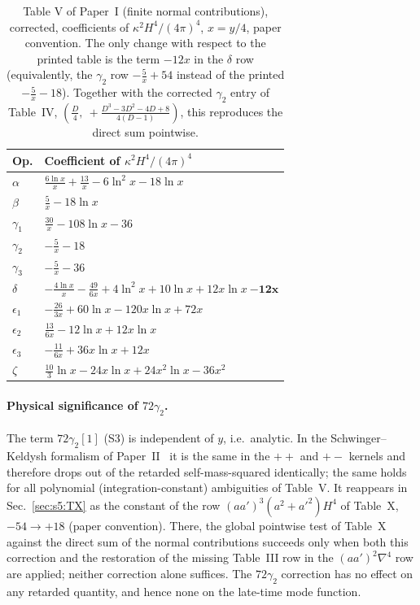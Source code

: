 \documentclass[aps,prd,onecolumn,10pt,nofootinbib,floatfix]{revtex4-2}
\newcommand{\PI}{Paper~I}
\newcommand{\PII}{Paper~II}
\begin{document}
\begin{table}[tb]
\caption{Table V of \PI{} (finite normal contributions), corrected, coefficients of $\kappa^2H^4/(4\pi)^4$, $x=y/4$,
paper convention. The only change with respect to the printed table is the term $-12x$ in the $\delta$ row
(equivalently, the $\gamma_2$ row $-\frac5x+54$ instead of the printed $-\frac5x-18$). Together with the corrected
$\gamma_2$ entry of Table~IV, $(\frac D4,\ +\frac{D^3-3D^2-4D+8}{4(D-1)})$, this reproduces the direct sum pointwise.}
\label{tab:s4b:V}
\renewcommand{\arraystretch}{1.35}
\begin{ruledtabular}
\begin{tabular}{@{}ll@{}}
Op. & Coefficient of $\kappa^2H^4/(4\pi)^4$\\
\hline
$\alpha$ & $\frac{6\ln x}{x}+\frac{13}{x}-6\ln^2x-18\ln x$\\
$\beta$ & $\frac5x-18\ln x$\\
$\gamma_1$ & $\frac{30}{x}-108\ln x-36$\\
$\gamma_2$ & $-\frac5x-18$\\
$\gamma_3$ & $-\frac5x-36$\\
$\delta$ & $-\frac{4\ln x}{x}-\frac{49}{6x}+4\ln^2x+10\ln x+12x\ln x\ \bm{-12x}$\\
$\epsilon_1$ & $-\frac{26}{3x}+60\ln x-120x\ln x+72x$\\
$\epsilon_2$ & $\frac{13}{6x}-12\ln x+12x\ln x$\\
$\epsilon_3$ & $-\frac{11}{6x}+36x\ln x+12x$\\
$\zeta$ & $\frac{10}{3}\ln x-24x\ln x+24x^2\ln x-36x^2$\\
\end{tabular}
\end{ruledtabular}
\end{table}

\paragraph*{Physical significance of $72\gamma_2$.}
The term $72\gamma_2[1]$ (S3) is independent of $y$, i.e.\ analytic. In the Schwinger--Keldysh formalism of
\PII~\cite{KW08} it is the same in
the $++$ and $+-$ kernels and therefore drops out of the retarded self-mass-squared identically; the same holds for all
polynomial (integration-constant) ambiguities of Table~V\@. It reappears in Sec.~\ref{sec:s5:TX} as the constant
of the row $(aa')^3(a^2+a'^2)H^4$ of Table~X, $-54\to+18$ (paper convention). There, the global pointwise test of
Table~X against the direct sum of the normal contributions succeeds only when both this correction and the restoration
of the missing Table~III row in the $(aa')^2\nabla^4$ row are applied; neither correction alone suffices. The
$72\gamma_2$ correction has no effect on any retarded quantity, and hence none on the late-time mode function.
\end{document}

